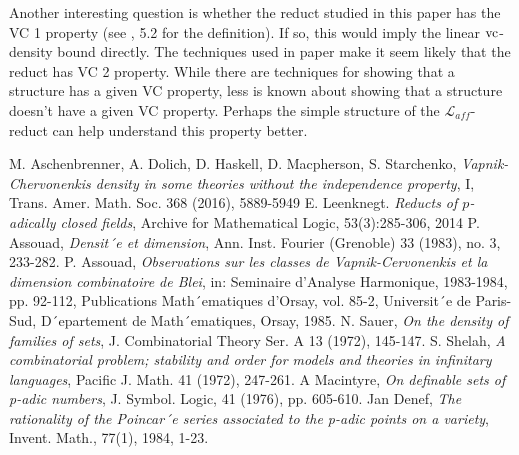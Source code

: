 \documentclass{amsart}
\newcommand{\LLA}{\mathcal L_{aff}}
\begin{document}
Another interesting question is whether the reduct studied in this paper has the VC 1 property (see \cite{density}, 5.2 for the definition).
If so, this would imply the linear $\operatorname{vc}$-density bound directly.
The techniques used in paper \cite{density} make it seem likely that the reduct has VC 2 property.
While there are techniques for showing that a structure has a given VC property,
less is known about showing that a structure doesn't have a given VC property.
Perhaps the simple structure of the $\LLA$-reduct can help understand this property better.


\begin{thebibliography}{9}
  
  M. Aschenbrenner, A. Dolich, D. Haskell, D. Macpherson, S. Starchenko,
  \textit{Vapnik-Chervonenkis density in some theories without the independence property}, I,
  Trans. Amer. Math. Soc. 368 (2016), 5889-5949
  E. Leenknegt. \textit{Reducts of $p$-adically closed fields}, Archive for Mathematical Logic, 53(3):285-306, 2014
  P. Assouad, \textit{Densit´e et dimension}, Ann. Inst. Fourier (Grenoble) 33 (1983), no. 3, 233-282.
  P. Assouad, \textit{Observations sur les classes de Vapnik-Cervonenkis et la dimension combinatoire de Blei},
  in: Seminaire d’Analyse Harmonique, 1983-1984, pp. 92-112, Publications Math´ematiques
  d’Orsay, vol. 85-2, Universit´e de Paris-Sud, D´epartement de Math´ematiques, Orsay, 1985.
  N. Sauer, \textit{On the density of families of sets}, J. Combinatorial Theory Ser. A 13 (1972), 145-147.
  S. Shelah, \textit{A combinatorial problem; stability and order for models and theories in infinitary languages},
  Pacific J. Math. 41 (1972), 247-261.
  A Macintyre,
  \textit{On definable sets of p-adic numbers},
  J. Symbol. Logic, 41 (1976), pp. 605-610.
  Jan Denef,
  \textit{The rationality of the Poincar´e series associated to the p-adic points on a variety},
  Invent. Math., 77(1), 1984, 1-23.
\end{thebibliography}
\end{document}
